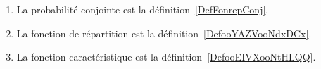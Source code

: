 
\begin{enumerate}
	\item
	      La probabilité conjointe est la définition~\ref{DefFonrepConj}.
	\item
	      La fonction de répartition est la définition~\ref{DefooYAZVooNdxDCx}.
	\item
	      La fonction caractéristique est la définition~\ref{DefooEIVXooNtHLQQ}.
\end{enumerate}
